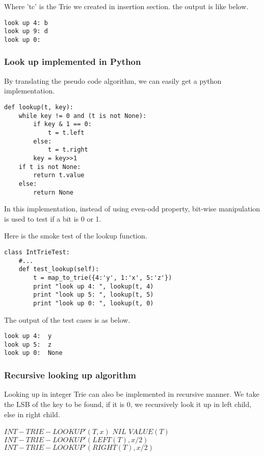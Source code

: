 \documentclass{article}
\begin{document}
Where 'tc' is the Trie we created in insertion section. the output is like below.
\begin{verbatim}
look up 4: b
look up 9: d
look up 0: 
\end{verbatim}

\subsubsection*{Look up implemented in Python}
By translating the pseudo code algorithm, we can easily get a python 
implementation.

\lstset{language=Python}
\begin{lstlisting}
def lookup(t, key):
    while key != 0 and (t is not None):
        if key & 1 == 0:
            t = t.left
        else:
            t = t.right
        key = key>>1
    if t is not None:
        return t.value
    else:
        return None
\end{lstlisting}

In this implementation, instead of using even-odd property, bit-wise
manipulation is used to test if a bit is 0 or 1.

Here is the smoke test of the lookup function.

\begin{lstlisting}
class IntTrieTest:
    #...
    def test_lookup(self):
        t = map_to_trie({4:'y', 1:'x', 5:'z'})
        print "look up 4: ", lookup(t, 4)
        print "look up 5: ", lookup(t, 5)
        print "look up 0: ", lookup(t, 0)
\end{lstlisting}

The output of the test cases is as below.

\begin{verbatim}
look up 4:  y
look up 5:  z
look up 0:  None
\end{verbatim}

\subsubsection{Recursive looking up algorithm}

Looking up in integer Trie can also be implemented in recursive manner.
We take the LSB of the key to be found, if it is 0, we recursively look
it up in left child, else in right child.

\begin{algorithmic}
\STATE $INT-TRIE-LOOKUP'(T, x)$
    \RETURN $NIL$
    \RETURN $VALUE(T)$
    \RETURN $INT-TRIE-LOOKUP'(LEFT(T), x/2)$
  \ELSE
    \RETURN $INT-TRIE-LOOKUP'(RIGHT(T), x/2)$
  \ENDIF
\end{algorithmic}
\end{document}
